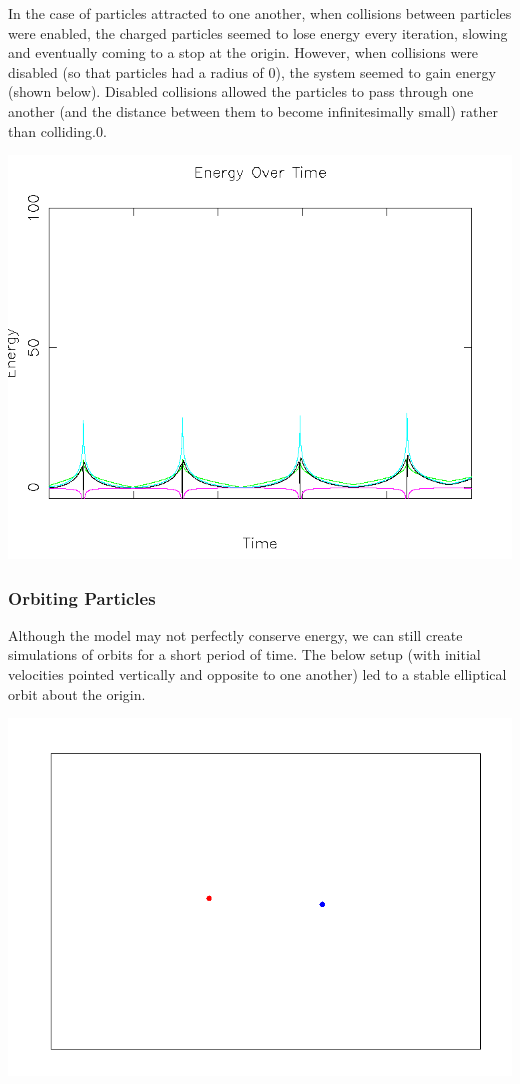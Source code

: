 \documentclass{article}
\begin{document}
In the case of particles attracted to one another, when collisions between particles were enabled,
the charged particles seemed to lose energy every iteration, slowing and eventually coming to a stop at the origin.
However, when collisions were disabled (so that particles had a radius of 0),
the system seemed to gain energy (shown below). Disabled collisions allowed
the particles to pass through one another (and the distance between them to become infinitesimally small) rather than colliding.0.
\\
\begin{center}
    \includegraphics[scale=0.5]{charged_2_opp_energy_no_collision}
\end{center}

\subsubsection{Orbiting Particles}
Although the model may not perfectly conserve energy, we can still create simulations of orbits for a short period of time.
The below setup (with initial velocities pointed vertically and opposite to one another) led to a stable elliptical orbit about the origin.
\\
\begin{center}
    \includegraphics[scale=0.5]{orbit}
\end{center}
\end{document}
